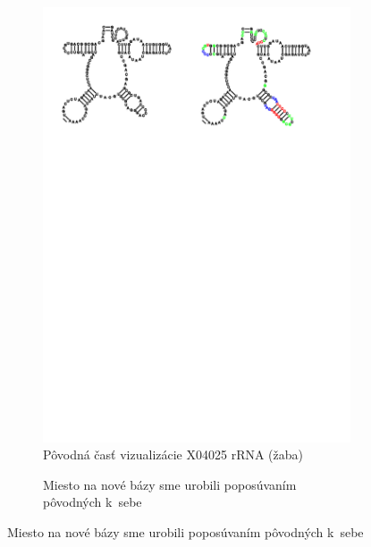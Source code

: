 \begin{figure}[t!]
  \centering
  \begin{subfigure}[t]{\wi}
    \caption{Pôvodná časť vizualizácie X04025 rRNA (žaba)}
    \includegraphics[clip, trim=1cm 21cm 12cm 1cm, width=1\textwidth]{../img/alg/insert/multibranch}
  \end{subfigure}
  \begin{subfigure}[t]{\wi}
    \caption{Miesto na nové bázy sme urobili poposúvaním pôvodných k~sebe}

\end{subfigure}
\end{figure}
